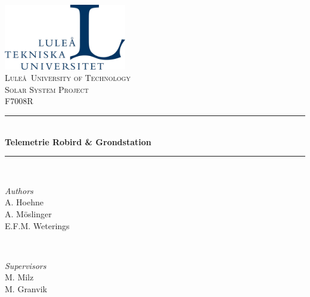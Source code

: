 
\begin{titlepage} %
	\center %
	\newcommand{\HRule}{\rule{\linewidth}{0.5mm}} %
	
	
	\includegraphics[width=0.4\textwidth]{figures/LTU_logo.jpg}\\[1cm]
		
	
	\textsc{\Huge Lule\aa \ University of Technology}\\[1.5cm]
	
	\textsc{\LARGE Solar System Project}\\[0.3cm]
	
	\textsc{\large F7008R}\\[0.5cm]
	
	
	\HRule\\[0.4cm]
	
	{\Huge\bfseries Telemetrie Robird \& Grondstation}\\[0.4cm]
	
	\HRule\\[1.5cm]
	
	
	\begin{minipage}{0.4\textwidth}
		\begin{flushleft}
			\large
			\textit{Authors}\\
			A. Hoehne\\
			A. M\"{o}slinger\\
			E.F.M. Weterings
		\end{flushleft}
	\end{minipage}
	~
	\begin{minipage}{0.4\textwidth}
		\begin{flushright}
			\large
			\textit{Supervisors}\\
			M. Milz\\
			M. Granvik\\
		\end{flushright}
	\end{minipage}
	

\end{titlepage}
